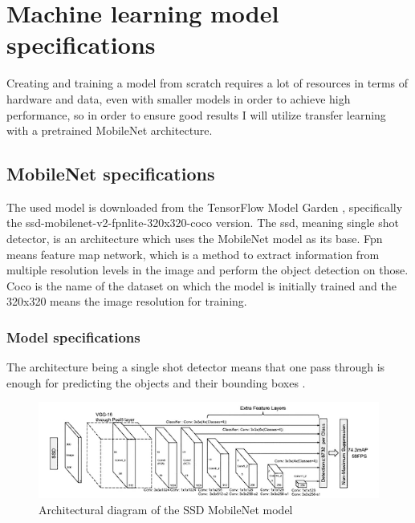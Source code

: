 \chapter{Machine learning model specifications}
\label{chap:model}

\par Creating and training a model from scratch requires a lot of resources in terms of hardware and data, even with smaller models in order to achieve high performance, so in order to ensure good results I will utilize transfer learning with a pretrained MobileNet architecture.

\section{MobileNet specifications}
\label{sec:modelsec1}

\par The used model is downloaded from the TensorFlow Model Garden \cite{modelGarden}, specifically the ssd-mobilenet-v2-fpnlite-320x320-coco version. The ssd, meaning single shot detector, is an architecture which uses the MobileNet model as its base. Fpn means feature map network, which is a method to extract information from multiple resolution levels in the image and perform the object detection on those. Coco is the name of the dataset on which the model is initially trained and the 320x320 means the image resolution for training.

\subsection{Model specifications}
\label{sec:modelsec1subsec1}

\par The architecture being a single shot detector means that one pass through is enough for predicting the objects and their bounding boxes \cite{ssd}.

\begin{figure}
    \centering
    \includegraphics[width=0.5\linewidth]{figures/SSD.png}
    \caption{Architectural diagram of the SSD MobileNet model \cite{ssd}}
    \label{fig:ssd}
\end{figure}

